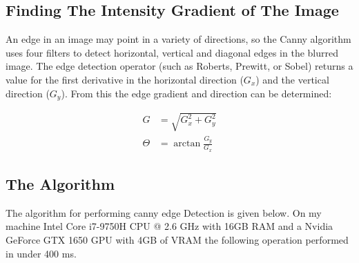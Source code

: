 \documentclass{article}
\begin{document}
\subsection{Finding The Intensity Gradient of The Image}
An edge in an image may point in a variety of directions, so the Canny algorithm uses four filters to 
detect horizontal, vertical and diagonal edges in the blurred image. The edge detection operator (such as 
Roberts, Prewitt, or Sobel) returns a value for the first derivative in the horizontal direction ($G_x$) 
and the vertical direction ($G_y$). From this the edge gradient and direction can be determined:

\begin{align*}
    G &= \sqrt{G_x^2 + G_y^2} \\
    \Theta &= \arctan{\frac{G_y}{G_x}}
\end{align*}

\subsection{The Algorithm}
The algorithm for performing canny edge Detection is given below. On my machine Intel Core i7-9750H CPU @
2.6 GHz with 16GB RAM and a Nvidia GeForce GTX 1650 GPU with 4GB of VRAM the following operation performed
in under 400 ms.
\end{document}
